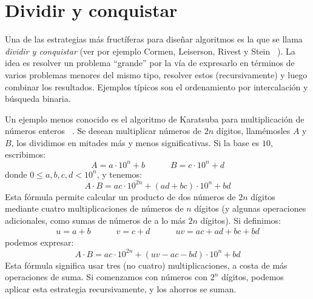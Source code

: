 

\section{Dividir y conquistar}
\label{sec:dividir-y-conquistar}


  Una de las estrategias más fructíferas para diseñar algoritmos
  es la que se llama \emph{dividir y conquistar}%
  (ver por ejemplo Cormen, Leiserson, Rivest y Stein~%
    \cite{cormen09:_introd_algor}).
  La idea es resolver un problema ``grande''
  por la vía de expresarlo
  en términos de varios problemas menores del mismo tipo,
  resolver estos (recursivamente)
  y luego combinar los resultados.
  Ejemplos típicos son el ordenamiento por intercalación%
  y búsqueda binaria.%

  Un ejemplo menos conocido
  es el algoritmo de Karatsuba
  para multiplicación de números enteros~%
    \cite{karatsuba62:_multiplication}.%
  Se desean multiplicar números de \(2 n\) dígitos,
  llamémosles \(A\) y \(B\),
  los dividimos en mitades más y menos significativas.
  Si la base es \(10\),
  escribimos:
  \begin{equation*}
    A = a \cdot 10^n + b
    \hspace{3em}
    B = c \cdot 10^n + d
  \end{equation*}
  donde \(0 \le a, b, c, d < 10^n\),
  y tenemos:
  \begin{equation*}
    A \cdot B
      = a c \cdot 10^{2 n}
	  + (a d + b c) \cdot 10^n
	  + b d
  \end{equation*}
  Esta fórmula permite calcular un producto de dos números
  de \(2 n\) dígitos
  mediante cuatro multiplicaciones de números de \(n\) dígitos
  (y algunas operaciones adicionales,
   como sumas de números de a lo más \(2 n\) dígitos).
  Si definimos:
  \begin{align*}
    u = a + b
    \hspace{3em}
    v = c + d
    \hspace{3em}
    u v
      = a c + a d + b c + b d
  \end{align*}
  podemos expresar:
  \begin{equation*}
    A \cdot B
      = a c \cdot 10^{2 n} + (u v - a c - b d) \cdot 10^n + b d
  \end{equation*}
  Esta fórmula significa usar tres
  (no cuatro)
  multiplicaciones,
  a costa de más operaciones de suma.
  Si comenzamos con números con \(2^n\) dígitos,
  podemos aplicar esta estrategia recursivamente,
  y los ahorros se suman.

